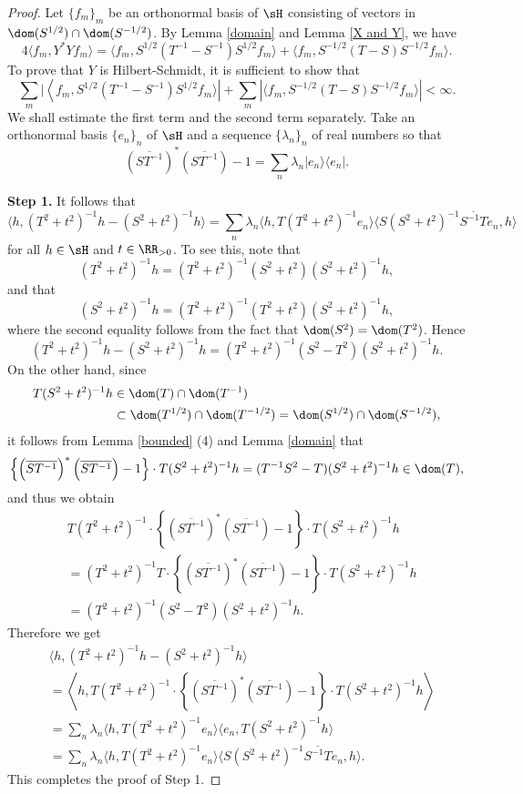\documentclass[12pt]{article}
\theoremstyle{plain}
\numberwithin{equation}{section}
\theoremstyle{remark}
\begin{document}
\begin{proof}
Let $\{f_m\}_m$ be an orthonormal basis of $\sH$ consisting of vectors in $\dom(S^{1/2})\cap\dom(S^{-1/2})$.
By Lemma \ref{domain} and Lemma \ref{X and Y}, we have
\[
4\langle f_m,Y^*Yf_m\rangle = \langle f_m,S^{1/2}(T^{-1}-S^{-1})S^{1/2}f_m\rangle + \langle f_m,S^{-1/2}(T-S)S^{-1/2}f_m\rangle.
\]
To prove that $Y$ is Hilbert-Schmidt, it is sufficient to show that
\[
\sum_m|\left\langle f_m,S^{1/2}(T^{-1}-S^{-1})S^{1/2}f_m\rangle\right| + \sum_m\left|\langle f_m,S^{-1/2}(T-S)S^{-1/2}f_m\rangle\right|<\infty.
\]
We shall estimate the first term and the second term separately.
Take an orthonormal basis $\{e_n\}_n$ of $\sH$ and a sequence $\{\lambda_n\}_n$ of real numbers so that
\[
 \left(\overline{ST^{-1}}\right)^*\left(\overline{ST^{-1}}\right)-1 = \sum_n\lambda_n|e_n\rangle\langle e_n|.
\]

\textbf{Step 1.} It follows that
\[
 \langle h,(T^2+t^2)^{-1}h-(S^2+t^2)^{-1}h\rangle = \sum_n\lambda_n\langle h,T(T^2+t^2)^{-1}e_n\rangle\langle S(S^2+t^2)^{-1}\overline{S^{-1}T}e_n,h\rangle
\]
for all $h\in\sH$ and $t\in\RR_{>0}$. To see this, note that
\[
 (T^2+t^2)^{-1}h = (T^2+t^2)^{-1}(S^2+t^2)(S^2+t^2)^{-1}h,
\]
and that
\[
(S^2+t^2)^{-1}h = (T^2+t^2)^{-1}(T^2+t^2)(S^2+t^2)^{-1}h,
\]
where the second equality follows from the fact that $\dom(S^2)=\dom(T^2)$.
Hence
\[
 (T^2+t^2)^{-1}h - (S^2+t^2)^{-1}h = (T^2+t^2)^{-1}(S^2-T^2)(S^2+t^2)^{-1}h.
\]
On the other hand, since
\begin{align*}
 T(S^2+t^2)^{-1}h & \in \dom(T)\cap\dom(T^{-1})\\
 & \subset\dom(T^{1/2})\cap\dom(T^{-1/2})
 = \dom(S^{1/2})\cap\dom(S^{-1/2}),
\end{align*}
it follows from Lemma \ref{bounded} (4) and Lemma \ref{domain} that
\[
\left\{\left(\overline{ST^{-1}}\right)^*\left(\overline{ST^{-1}}\right)-1\right\}\cdot T(S^2+t^2)^{-1}h
=(T^{-1}S^2-T)(S^2+t^2)^{-1}h\in\dom(T),
\]
and thus we obtain
\begin{align*}
&T(T^2+t^2)^{-1}\cdot \left\{\left(\overline{ST^{-1}}\right)^*\left(\overline{ST^{-1}}\right)-1\right\}\cdot T(S^2+t^2)^{-1}h\\
&= (T^2+t^2)^{-1}T\cdot \left\{\left(\overline{ST^{-1}}\right)^*\left(\overline{ST^{-1}}\right)-1\right\}\cdot T(S^2+t^2)^{-1}h\\
&= (T^2+t^2)^{-1}(S^2-T^2)(S^2+t^2)^{-1}h.
\end{align*}
Therefore we get
\begin{align*}
&\langle h,(T^2+t^2)^{-1}h - (S^2+t^2)^{-1}h\rangle\\
&= \left\langle h,T(T^2+t^2)^{-1}\cdot \left\{\left(\overline{ST^{-1}}\right)^*
\left(\overline{ST^{-1}}\right)-1\right\}\cdot T(S^2+t^2)^{-1}h\right\rangle\\
&= \sum_n\lambda_n\langle h,T(T^2+t^2)^{-1}e_n\rangle\langle e_n,T(S^2+t^2)^{-1}h\rangle\\
&= \sum_n\lambda_n\langle h,T(T^2+t^2)^{-1}e_n\rangle\langle S(S^2+t^2)^{-1}\overline{S^{-1}T}e_n,h\rangle.
\end{align*}
This completes the proof of Step 1.


\end{proof}
\end{document}
